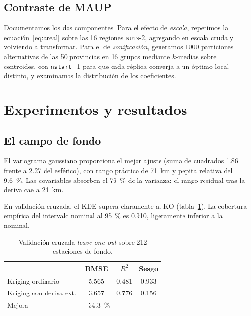 \documentclass[10pt,twocolumn,a4paper]{article}
\begin{document}
\subsection{Contraste de MAUP}

Documentamos los dos componentes. Para el efecto de \emph{escala}, repetimos
la ecuación~\eqref{eq:areal} sobre las \num{16} regiones \textsc{nuts}-2,
agregando en escala cruda y volviendo a transformar. Para el de
\emph{zonificación}, generamos \num{1000} particiones alternativas de las
\num{50} provincias en \num{16} grupos mediante $k$-medias sobre centroides,
con \texttt{nstart}=1 para que cada réplica converja a un óptimo local
distinto, y examinamos la distribución de los coeficientes.

\section{Experimentos y resultados}

\subsection{El campo de fondo}

El variograma gaussiano proporciona el mejor ajuste (suma de cuadrados
\num{1.86} frente a \num{2.27} del esférico), con rango práctico de
\SI{71}{\kilo\metre} y pepita relativa del \SI{9.6}{\percent}. Las covariables
absorben el \SI{76}{\percent} de la varianza: el rango residual tras la deriva
cae a \SI{24}{\kilo\metre}.

En validación cruzada, el KDE supera claramente al KO
(tabla~\ref{tab:kriging}). La cobertura empírica del intervalo nominal al
\SI{95}{\percent} es \num{0.910}, ligeramente inferior a la nominal.

\begin{table}[t]
\centering
\caption{Validación cruzada \emph{leave-one-out} sobre \num{212} estaciones
de fondo.}
\label{tab:kriging}
\small
\begin{tabular}{@{}lccc@{}}
\toprule
 & \textbf{RMSE} & \textbf{$R^2$} & \textbf{Sesgo} \\
\midrule
Kriging ordinario        & \num{5.565} & \num{0.481} & \num{0.933} \\
Kriging con deriva ext.  & \num{3.657} & \num{0.776} & \num{0.156} \\
\midrule
Mejora                   & \SI{-34.3}{\percent} & --- & --- \\
\bottomrule
\end{tabular}
\end{table}
\end{document}
